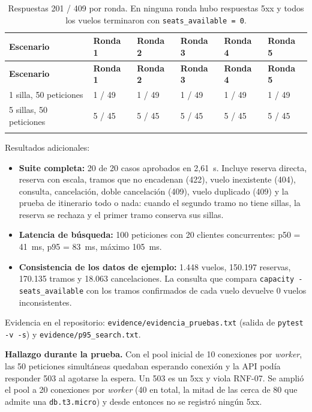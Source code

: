 \documentclass[10pt,letterpaper]{article}
\begin{document}
\begin{longtable}{@{}L{3.6cm} C{1.9cm} C{1.9cm} C{1.9cm} C{1.9cm} C{1.9cm}@{}}
\toprule \textbf{Escenario} & \textbf{Ronda 1} & \textbf{Ronda 2} & \textbf{Ronda 3} & \textbf{Ronda 4} & \textbf{Ronda 5} \\ \midrule \endfirsthead
\toprule \textbf{Escenario} & \textbf{Ronda 1} & \textbf{Ronda 2} & \textbf{Ronda 3} & \textbf{Ronda 4} & \textbf{Ronda 5} \\ \midrule {} silla, 50 peticiones & 1 / 49 & 1 / 49 & 1 / 49 & 1 / 49 & 1 / 49 \\
5 sillas, 50 peticiones & 5 / 45 & 5 / 45 & 5 / 45 & 5 / 45 & 5 / 45 \\
\bottomrule
\caption{Respuestas 201 / 409 por ronda. En ninguna ronda hubo respuestas 5xx y todos los vuelos terminaron con \texttt{seats\_available = 0}.}
\end{longtable}

Resultados adicionales:
\begin{itemize}
  \item \textbf{Suite completa:} 20 de 20 casos aprobados en 2,61~s. Incluye reserva directa, reserva con escala, tramos que no encadenan (422), vuelo inexistente (404), consulta, cancelación, doble cancelación (409), vuelo duplicado (409) y la prueba de itinerario todo o nada: cuando el segundo tramo no tiene sillas, la reserva se rechaza y el primer tramo conserva sus sillas.
  \item \textbf{Latencia de búsqueda:} 100 peticiones con 20 clientes concurrentes: p50 = 41~ms, p95 = 83~ms, máximo 105~ms.
  \item \textbf{Consistencia de los datos de ejemplo:} 1.448 vuelos, 150.197 reservas, 170.135 tramos y 18.063 cancelaciones. La consulta que compara \texttt{capacity - seats\_available} con los tramos confirmados de cada vuelo devuelve 0 vuelos inconsistentes.
\end{itemize}

Evidencia en el repositorio: \texttt{evidence/evidencia\_pruebas.txt} (salida de \texttt{pytest -v -s}) y \texttt{evidence/p95\_search.txt}.

\textbf{Hallazgo durante la prueba.} Con el pool inicial de 10 conexiones por \emph{worker}, las 50 peticiones simultáneas quedaban esperando conexión y la API podía responder 503 al agotarse la espera. Un 503 es un 5xx y viola RNF-07. Se amplió el pool a 20 conexiones por \emph{worker} (40 en total, la mitad de las cerca de 80 que admite una \texttt{db.t3.micro}) y desde entonces no se registró ningún 5xx.
\end{document}

